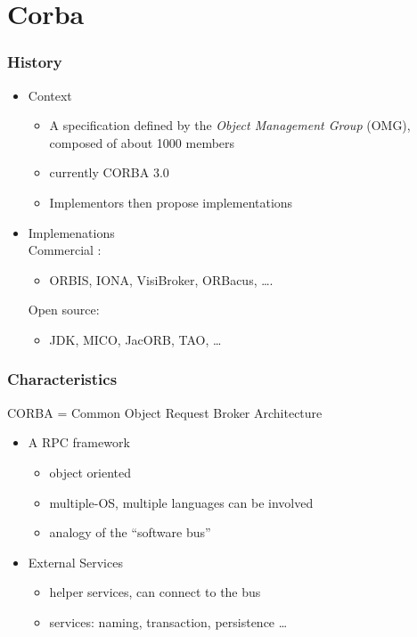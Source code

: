 \documentclass[bigger,hyperref={colorlinks=true, urlcolor=red, plainpages=false, pdfpagelabels, bookmarksnumbered}]{beamer}
\begin{document}
\section{Corba}
\label{sec-4}
\begin{frame}
\frametitle{History}
\label{sec-4-1}
\begin{itemize}

\item Context
\label{sec-4-1-1}%
\begin{itemize}
\item A specification defined by the \emph{Object Management Group} (OMG), 
     composed of about 1000 members
\item currently CORBA 3.0
\item Implementors then propose implementations
\end{itemize}


\item Implemenations\\
\label{sec-4-1-2}%
Commercial :
\begin{itemize}
\item ORBIS, IONA, VisiBroker, ORBacus, \ldots{}.
\end{itemize}
     Open source:
\begin{itemize}
\item JDK, MICO, JacORB, TAO, \ldots{}
\end{itemize}

\end{itemize} %
\end{frame}
\begin{frame}
\frametitle{Characteristics}
\label{sec-4-2}


CORBA = Common Object Request Broker Architecture
\begin{itemize}

\item A RPC framework
\label{sec-4-2-1}%
\begin{itemize}
\item object oriented
\item multiple-OS, multiple languages can be involved
\item analogy of the ``software bus''
\end{itemize}

\item External Services
\label{sec-4-2-2}%
\begin{itemize}
\item helper services, can connect to the bus
\item services: naming, transaction, persistence \ldots{}
\end{itemize}

\end{itemize} %
\end{frame}
\end{document}
